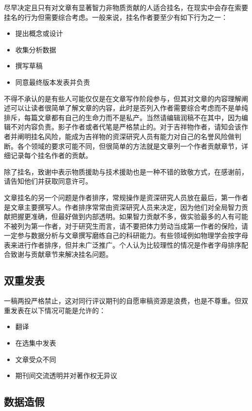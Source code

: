 \documentclass[]{tufte-book}
\providecommand{\tightlist}{%
  \setlength{\itemsep}{0pt}\setlength{\parskip}{0pt}}
\begin{document}
尽早决定且只有对文章有显著智力非物质贡献的人适合挂名，在现实中会存在索要挂名的行为但需要综合考虑。一般来说，挂名作者要至少有如下行为之一：

\begin{itemize}
\tightlist
\item
  提出概念或设计
\item
  收集分析数据
\item
  撰写草稿
\item
  同意最终版本发表并负责
\end{itemize}

不得不承认的是有些人可能仅仅是在文章写作阶段参与，但其对文章的内容理解阐述可以让读者很简单了解文章的内容，此时是否列入作者需要综合考虑而不是单纯排斥，每篇文章都有自己的生命力而不是私产。当然请编辑润稿不在其中，因为编辑不对内容负责。影子作者或者代笔是严格禁止的。对于吉祥物作者，请知会该作者并阐明挂名风险，能成为吉祥物的资深研究人员有能力对自己的名誉风险做判断。各个领域的要求可能不同，但很简单的方法就是文章列一个作者贡献章节，详细记录每个挂名作者的贡献。

除了挂名，致谢中表示物质援助与技术援助也是一种不错的致敬方式，在感谢前，请告知他们并获取同意许可。

文章挂名的另一个问题是作者排序，常规操作是资深研究人员放在最后，第一作者是文章主要撰写人。作者排序常常由资深研究人员来决定，因为他们对全局智力贡献把握更准确，但最好做到内部透明。如果智力贡献不多，做实验最多的人有可能不被列为第一作者，对于研究生而言，请不要把体力劳动当成第一作者的保险，请一定参与数据分析与文章撰写磨练自己的科研能力。有些领域例如物理学会按字母表来进行作者排序，但并未广泛推广。个人认为比较理性的情况是作者字母排序配合致谢与贡献章节来解决挂名问题。

\hypertarget{ux53ccux91cdux53d1ux8868}{%
\subsection{双重发表}\label{ux53ccux91cdux53d1ux8868}}

一稿两投严格禁止，这对同行评议期刊的自愿审稿资源是浪费，也是不尊重。但双重发表在以下情况可能是允许的：

\begin{itemize}
\tightlist
\item
  翻译
\item
  在选集中发表
\item
  文章受众不同
\item
  期刊间交流透明并对著作权无异议
\end{itemize}

\hypertarget{ux6570ux636eux9020ux5047}{%
\subsection{数据造假}\label{ux6570ux636eux9020ux5047}}
\end{document}
